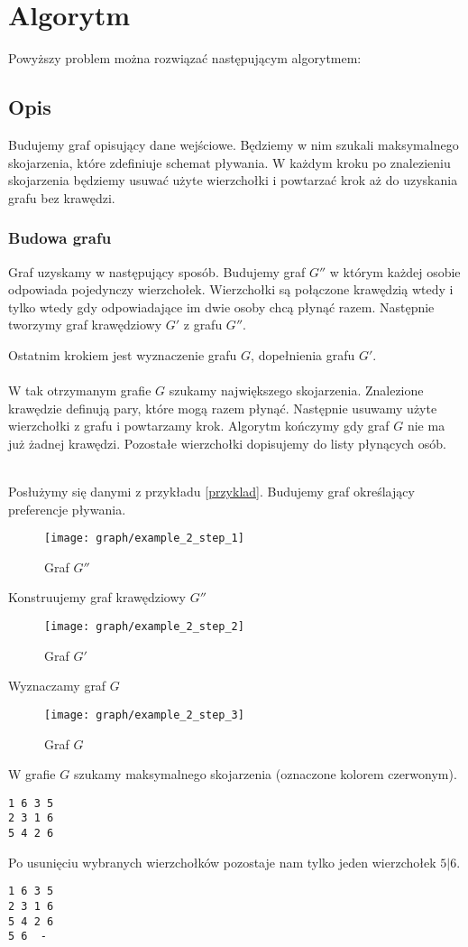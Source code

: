 \documentclass{llncs}
\begin{document}
\section{Algorytm}
Powyższy problem można rozwiązać następującym algorytmem:

\subsection{Opis}
Budujemy graf opisujący dane wejściowe. Będziemy w nim szukali 
maksymalnego skojarzenia, które zdefiniuje schemat pływania.
W każdym kroku po znalezieniu skojarzenia będziemy usuwać 
użyte wierzchołki i powtarzać krok aż do uzyskania grafu bez krawędzi.

\subsubsection{Budowa grafu}
Graf uzyskamy w następujący sposób. Budujemy
graf $G''$ w którym każdej osobie odpowiada pojedynczy 
wierzchołek. Wierzchołki są połączone krawędzią wtedy
i tylko wtedy gdy odpowiadające im dwie osoby chcą płynąć razem.
Następnie tworzymy graf krawędziowy $G'$ z grafu $G''$.

Ostatnim krokiem jest wyznaczenie grafu $G$,
dopełnienia grafu $G'$.
\\\\
W tak otrzymanym grafie $G$ szukamy największego 
skojarzenia. Znalezione krawędzie definują
pary, które mogą razem płynąć. Następnie usuwamy użyte
wierzchołki z grafu i powtarzamy krok.
Algorytm kończymy gdy graf $G$ nie ma już żadnej krawędzi.
Pozostałe wierzchołki dopisujemy do listy płynących
osób.
\begin{example}~\\
Posłużymy się danymi z przykładu \ref{przyklad}.
Budujemy graf określający preferencje pływania.
\begin{figure}[H]
  \caption{Graf $G''$}
  \centering
	\texttt{[image: graph/example\_2\_step\_1]}
\end{figure}
Konstruujemy graf krawędziowy $G''$
\begin{figure}[H]
  \caption{Graf $G'$}
  \centering
	\texttt{[image: graph/example\_2\_step\_2]}
\end{figure}
Wyznaczamy graf $G$
\begin{figure}[H]
  \caption{Graf $G$}
  \centering
	\texttt{[image: graph/example\_2\_step\_3]}
\end{figure}

W grafie $G$ szukamy maksymalnego skojarzenia (oznaczone kolorem czerwonym).
\begin{lstlisting}[title=Maksymalne skojarzenie]
1 6	3 5
2 3	1 6
5 4	2 6
\end{lstlisting}
Po usunięciu wybranych wierzchołków pozostaje nam tylko jeden 
wierzchołek $5|6$.
\begin{lstlisting}[title=Możliwy rozkład pływania]
1 6	3 5
2 3	1 6
5 4	2 6
5 6	 -
\end{lstlisting}

\end{example}
\end{document}
